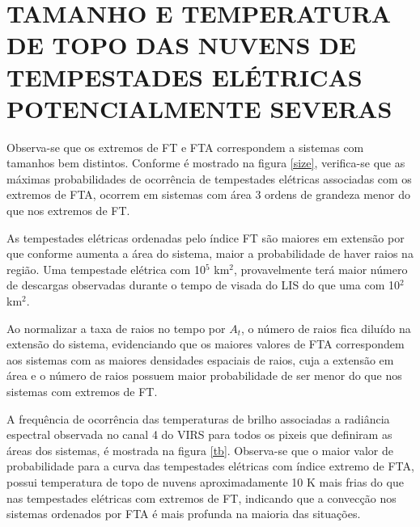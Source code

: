 

\section{TAMANHO E TEMPERATURA DE TOPO DAS NUVENS DE TEMPESTADES ELÉTRICAS POTENCIALMENTE SEVERAS}

Observa-se que os extremos de FT e FTA correspondem a sistemas com tamanhos bem distintos. Conforme é mostrado na figura \ref{size}, verifica-se que as máximas probabilidades de ocorrência de tempestades elétricas associadas com os extremos de FTA, ocorrem em sistemas com área 3 ordens de grandeza menor do que nos extremos de FT.


As tempestades elétricas ordenadas pelo índice FT são maiores em extensão por que conforme aumenta a área do sistema, maior a probabilidade de haver raios na região. Uma tempestade elétrica com 10$^5$ km$^2$, provavelmente terá maior número de descargas observadas durante o tempo de visada do LIS do que uma com 10$^2$ km$^2$. 


Ao normalizar a taxa de raios no tempo por $A_t$, o número de raios fica diluído na extensão do sistema, evidenciando que os maiores valores de FTA correspondem aos sistemas com as maiores densidades espaciais de raios, cuja a extensão em área e o número de raios possuem maior probabilidade de ser menor do que nos sistemas com extremos de FT.

A frequência de ocorrência das temperaturas de brilho associadas a radiância espectral observada no canal 4 do VIRS para todos os pixeis que definiram as áreas dos sistemas, é mostrada na figura \ref{tb}. Observa-se que o maior valor de probabilidade para a curva das tempestades elétricas com índice extremo de FTA, possui temperatura de topo de nuvens aproximadamente 10 K mais frias do que nas tempestades elétricas com extremos de FT, indicando que a convecção nos sistemas ordenados por FTA é mais profunda na maioria das situações.



